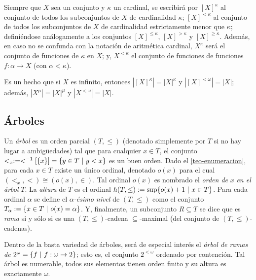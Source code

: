     \index[sym]{$[X]^\kappa$}\index[sym]{$[X]^{<\kappa}$}\index[sym]{$[X]^{\leq \kappa}$}\index[sym]{$[X]^{> \kappa}$}\index[sym]{$[X]^{\geq \kappa}$}
    Siempre que $X$ sea un conjunto y $\kappa$ un cardinal, se escribirá por $[X]^\kappa$ al conjunto de todos los subconjuntos de $X$ de cardinalidad $\kappa$; $[X]^{<\kappa}$ al conjunto de todos los subconjuntos de $X$ de cardinalidad estrictamente menor que $\kappa$; definiéndose análogamente a los conjuntos $[X]^{\leq \kappa}$, $[X]^{>\kappa}$ y $[X]^{\geq \kappa}$. Además, en caso no se confunda con la notación de aritmética cardinal, $X^\kappa$ será el conjunto de funciones de $\kappa$ en $X$; y, $X^{<\kappa}$ el conjunto de funciones de funciones $f:\alpha \to X$ (con $\alpha < \kappa$).

    Es un hecho que si $X$ es infinito, entonces $|[X]^\kappa|=|X|^\kappa$ y $|[X]^{<\omega}|=|X|$; además, $|X^\mu|=|X|^\mu$ y $|X^{<\omega}|=|X|$.

    \subsection{Árboles}

    Un \textit{árbol} es un orden parcial $(T,\leq)$ (denotado simplemente por $T$ si no hay lugar a ambigüedades) tal que para cualquier $x \in T$, el conjunto $<_x:=<^{-1}[\{x\}]=\{y \in T \text{ $|$ } y < x\}$ es un buen orden. Dado el \autoref{teo-enumeracion}, para cada $x \in T$ existe un único ordinal, denotado $o(x)$ para el cual $(<_x,<) \cong (o(x),\in)$. Tal ordinal $o(x)$ es nombrado el \textit{orden de} $x$ \textit{en el árbol} $T$. La \textit{altura} de $T$ es el ordinal $h(T,\leq):=\sup\{o(x) +1 \text{ $|$ } x \in T\}$. Para cada ordinal $\alpha$ se define el $\alpha$\textit{-ésimo nivel} de $(T,\leq)$ como el conjunto $T_\alpha := \{ x \in T \text{ $|$ } o(x) = \alpha \}$. Y, finalmente, un subconjunto $R \subseteq T$ se dice que es \textit{rama} si y sólo si es una $(T,\leq)$-cadena $\subseteq$-maximal (del conjunto de $(T,\leq)$-cadenas).

    Dentro de la basta variedad de árboles, será de especial interés el \textit{árbol de ramas de} $2^\omega=\{f \text{ $|$ } f:\omega \to 2\}$; esto es, el conjunto $2^{<\omega}$ ordenado por contención. Tal árbol es numerable, todos sus elementos tienen orden finito y su altura es exactamente $\omega$.

